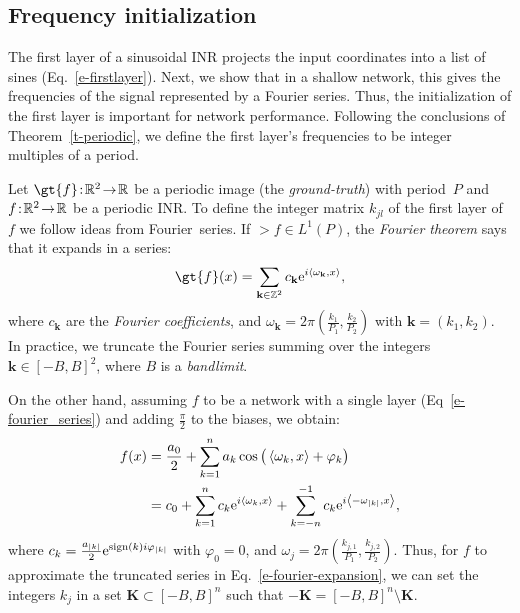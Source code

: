 \subsection{Frequency initialization}
\label{s-initialization}
The first layer of a sinusoidal INR projects the input coordinates into a list of sines (Eq.~\ref{e-firstlayer}). Next, we show that in a shallow network, this gives the frequencies of the signal represented by a Fourier series. Thus, the initialization of the first layer is important for network performance.
Following the conclusions of Theorem~\ref{t-periodic}, we define the first layer's frequencies to be integer multiples of a period.

Let $\gt{f}\!:\!\R^2\!\to\! \R$ be a periodic image (the \textit{ground-truth}) with period~$P$ and ${f}\!:\!\mathbb{R}^2\!\to\! \mathbb{R}$ be a periodic INR.
To define the integer matrix $k_{jl}$ of the first layer of $f$ we follow ideas from Fourier~series.
If $\gt{f}\in L^1(P)$, the \textit{Fourier theorem} says that it expands in a series:
\begin{align}\label{e-fourier-expansion}
    \gt{f}(x)=\sum_{\textbf{k}\in \Z^2} c_\textbf{k} \text{e}^{i\dot{\omega_{{\textbf{k}}}}{ x}},
\end{align}
where $c_\textbf{k}$ are the \textit{Fourier coefficients}, and $\omega_{\textbf{k}}=2\pi\left(\frac{k_1}{P_1}, \frac{k_2}{P_2}\right)$ with $\textbf{k}=(k_1,k_2)$. 
%
In practice, we truncate the Fourier series summing over the integers $\textbf{k}\in[-B, B]^2$, where $B$ is a \textit{bandlimit}.
%

On the other hand, assuming $f$ to be a network with a single layer (Eq~\eqref{e-fourier_series}) and adding $\frac{\pi}{2}$ to the biases, we obtain:
\begin{align}\small
    f(x) &=  \frac{a_0}{2} + \sum_{k=1}^{n} a_k  \cos\big(\left\langle\omega_k, x\right\rangle+ \varphi_k\big)\\
    &=  c_0 + \sum_{k=1}^{n} c_k  \text{e}^{i\left\langle\omega_{{k}}, x\right\rangle}+ \sum_{k=-n}^{-1} c_k  \text{e}^{i\left\langle-\omega_{\left|k\right|}, x\right\rangle},\label{e-mlp2complex}
\end{align}
where $c_k=\frac{a_{\left|k\right|}}{2}\text{e}^{\text{sign}(k)i\varphi_{\left|k\right|}}$ with $\varphi_0=0$, and $\omega_{j}=2\pi\left(\frac{k_{j,1}}{P_1}, \frac{k_{j,2}}{P_2}\right)$. 
%
Thus, for $f$ to approximate the truncated series in Eq.~\eqref{e-fourier-expansion}, we can set
the integers $k_{j}$ in a set $\textbf{K}\subset [-B,B]^n$ such that $-\textbf{K} = [-B,B]^n\setminus \textbf{K}$.

